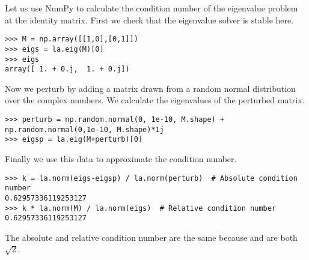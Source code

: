Let us use NumPy to calculate the condition number of the eigenvalue problem at the identity matrix.
First we check that the eigenvalue solver is stable here.
\begin{lstlisting}
>>> M = np.array([[1,0],[0,1]])
>>> eigs = la.eig(M)[0]
>>> eigs
array([ 1. + 0.j,  1. + 0.j])
\end{lstlisting}
Now we perturb  by adding a matrix drawn from a random normal distribution over the complex numbers.
We calculate the eigenvalues of the perturbed matrix.
\begin{lstlisting}
>>> perturb = np.random.normal(0, 1e-10, M.shape) + np.random.normal(0,1e-10, M.shape)*1j
>>> eigsp = la.eig(M+perturb)[0]
\end{lstlisting}
Finally we use this data to approximate the condition number.
\begin{lstlisting}
>>> k = la.norm(eigs-eigsp) / la.norm(perturb)	# Absolute condition number
0.62957336119253127
>>> k * la.norm(M) / la.norm(eigs)	# Relative condition number
0.62957336119253127
\end{lstlisting}
The absolute and relative condition number are the same because  and  are both $\sqrt{2}$.


